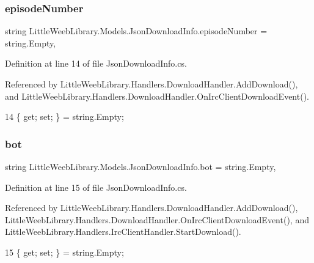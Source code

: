 \subsubsection{\texorpdfstring{episode\+Number}{episodeNumber}}
{\footnotesize\ttfamily string Little\+Weeb\+Library.\+Models.\+Json\+Download\+Info.\+episode\+Number = string.\+Empty\hspace{0.3cm}{\ttfamily [get]}, {\ttfamily [set]}}



Definition at line 14 of file Json\+Download\+Info.\+cs.



Referenced by Little\+Weeb\+Library.\+Handlers.\+Download\+Handler.\+Add\+Download(), and Little\+Weeb\+Library.\+Handlers.\+Download\+Handler.\+On\+Irc\+Client\+Download\+Event().


\begin{DoxyCode}
14 \{ \textcolor{keyword}{get}; \textcolor{keyword}{set}; \} = \textcolor{keywordtype}{string}.Empty;
\end{DoxyCode}
\mbox{\label{class_little_weeb_library_1_1_models_1_1_json_download_info_a0c8281bcd1f8766ddc86d89f0dc1b23c}} 
\subsubsection{\texorpdfstring{bot}{bot}}
{\footnotesize\ttfamily string Little\+Weeb\+Library.\+Models.\+Json\+Download\+Info.\+bot = string.\+Empty\hspace{0.3cm}{\ttfamily [get]}, {\ttfamily [set]}}



Definition at line 15 of file Json\+Download\+Info.\+cs.



Referenced by Little\+Weeb\+Library.\+Handlers.\+Download\+Handler.\+Add\+Download(), Little\+Weeb\+Library.\+Handlers.\+Download\+Handler.\+On\+Irc\+Client\+Download\+Event(), and Little\+Weeb\+Library.\+Handlers.\+Irc\+Client\+Handler.\+Start\+Download().


\begin{DoxyCode}
15 \{ \textcolor{keyword}{get}; \textcolor{keyword}{set}; \} = \textcolor{keywordtype}{string}.Empty;
\end{DoxyCode}
\mbox{\label{class_little_weeb_library_1_1_models_1_1_json_download_info_a22ff0d4dde2f90e7ee5048a9cf01393f}} 
